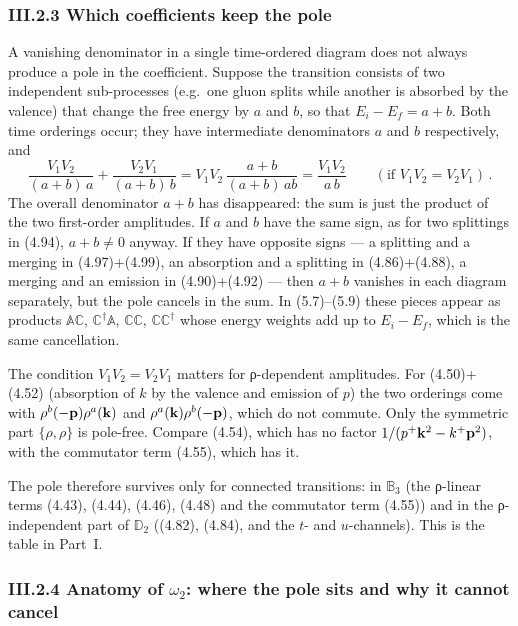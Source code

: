 \subsubsection*{III.2.3 Which coefficients keep the pole}

A vanishing denominator in a single time-ordered diagram does not always produce a pole in the coefficient. Suppose the transition consists of two independent sub-processes (e.g.\ one gluon splits while another is absorbed by the valence) that change the free energy by $a$ and $b$, so that $E_i-E_f=a+b$. Both time orderings occur; they have intermediate denominators $a$ and $b$ respectively, and
\begin{equation}
\frac{V_1V_2}{(a+b)\,a}+\frac{V_2V_1}{(a+b)\,b}=V_1V_2\,\frac{a+b}{(a+b)\,ab}=\frac{V_1V_2}{a\,b}\qquad(\text{if }V_1V_2=V_2V_1)\,.
\label{III:indep}
\end{equation}
The overall denominator $a+b$ has disappeared: the sum is just the product of the two first-order amplitudes. If $a$ and $b$ have the same sign, as for two splittings in (4.94), $a+b\neq0$ anyway. If they have opposite signs --- a splitting and a merging in (4.97)+(4.99), an absorption and a splitting in (4.86)+(4.88), a merging and an emission in (4.90)+(4.92) --- then $a+b$ vanishes in each diagram separately, but the pole cancels in the sum. In (5.7)--(5.9) these pieces appear as products $\mathbb A\mathbb C$, $\mathbb C^\dagger\mathbb A$, $\mathbb C\mathbb C$, $\mathbb C\mathbb C^\dagger$ whose energy weights add up to $E_i-E_f$, which is the same cancellation.

The condition $V_1V_2=V_2V_1$ matters for ρ-dependent amplitudes. For (4.50)+(4.52) (absorption of $k$ by the valence and emission of $p$) the two orderings come with $\rho^b(-\mathbf{p})\rho^a(\mathbf{k})$ and $\rho^a(\mathbf{k})\rho^b(-\mathbf{p})$, which do not commute. Only the symmetric part $\{\rho,\rho\}$ is pole-free. Compare (4.54), which has no factor $1/(p^+\mathbf{k}^2-k^+\mathbf{p}^2)$, with the commutator term (4.55), which has it.

The pole therefore survives only for connected transitions: in $\mathbb B_3$ (the ρ-linear terms (4.43), (4.44), (4.46), (4.48) and the commutator term (4.55)) and in the ρ-independent part of $\mathbb D_2$ ((4.82), (4.84), and the $t$- and $u$-channels). This is the table in Part~I.

\subsubsection*{III.2.4 Anatomy of $\omega_2$: where the pole sits and why it cannot cancel}


